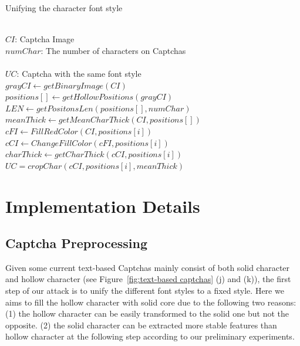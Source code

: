     \begin{algorithm}[!t]
        \centering
        \caption{Unifying the character font style}
        \label{alg:unify_font_style}
        \begin{algorithmic}[1]
            \REQUIRE~~\\
                $CI$: Captcha Image  \\
                $numChar$: The number of characters on Captchas\\
            \ENSURE~~\\
                $UC$: Captcha with the same font style \\
            \STATE $grayCI \leftarrow getBinaryImage(CI)$ \\
            \STATE $positions[] \leftarrow getHollowPositions(grayCI)$ \\
            \STATE $LEN \leftarrow getPositonsLen(positions[], numChar)$ \\
            \STATE $meanThick \leftarrow getMeanCharThick(CI, positions[])$ \\
                \STATE $cFI \leftarrow FillRedColor(CI, positions[i])$ \\
                \STATE $cCI \leftarrow ChangeFillColor(cFI, positions[i])$ \\
                \STATE $charThick \leftarrow getCharThick(cCI, positions[i])$ \\
                    \STATE $UC=cropChar(cCI, positions[i], meanThick)$ \\
                \ENDIF
            \ENDFOR
        \end{algorithmic}
    \end{algorithm}
\section{Implementation Details}

\subsection{Captcha Preprocessing}
Given some current text-based Captchas mainly consist of both solid character and hollow character (see Figure~\ref{fig:text-based captchas} (j) and (k)), the first step of our attack is to unify the different font styles to a fixed style. Here we aims to fill the hollow character with solid core due to the following two reasons:
(1) the hollow character can be easily transformed to the solid one but not the opposite.
(2) the solid character can be extracted more stable features than hollow character at the following step according to our preliminary experiments.

